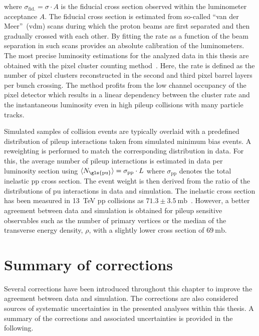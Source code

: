 where $\sigma_\mathrm{fid.}=\sigma\cdot A$ is the fiducial cross section observed within the luminometer acceptance $A$. The fiducial cross section is estimated from so-called ``van der Meer''~(\gls{vdm}) scans during which the proton beams are first separated and then gradually crossed with each other. By fitting the rate as a function of the beam separation in such scans provides an absolute calibration of the luminometers. The most precise luminosity estimations for the analyzed data in this thesis are obtained with the pixel cluster counting method~\cite{CMS-PAS-LUM-13-001,CMS-PAS-LUM-15-001,CMS-PAS-LUM-17-001}. Here, the rate is defined as the number of pixel clusters reconstructed in the second and third pixel barrel layers per bunch crossing. The method profits from the low channel occupancy of the pixel detector which results in a linear dependency between the cluster rate and the instantaneous luminosity even in high pileup collisions with many particle tracks.

Simulated samples of collision events are typically overlaid with a predefined distribution of pileup interactions taken from simulated minimum bias events. A reweighting is performed to match the corresponding distribution in data. For this, the average number of pileup interactions is estimated in data per luminosity section using $\langle N_\mathrm{\gls{pu}}\rangle=\sigma_\mathrm{pp}\cdot L$ where $\sigma_\mathrm{pp}$ denotes the total inelastic pp cross section. The event weight is then derived from the ratio of the distributions of \gls{pu} interactions in data and simulation. The inelastic cross section has been measured in 13~TeV pp collisions as $71.3\pm3.5~\mathrm{mb}$~\cite{CMS-PAS-FSQ-15-005}. However, a better agreement between data and simulation is obtained for pileup sensitive observables such as the number of primary vertices or the median of the transverse energy density, $\rho$, with a slightly lower cross section of $69~\mathrm{mb}$.


\section{Summary of corrections}
\label{sec:reconstruction-summary}

Several corrections have been introduced throughout this chapter to improve the agreement between data and simulation. The corrections are also considered sources of systematic uncertainties in the presented analyses within this thesis. A summary of the corrections and associated uncertainties is provided in the following.

